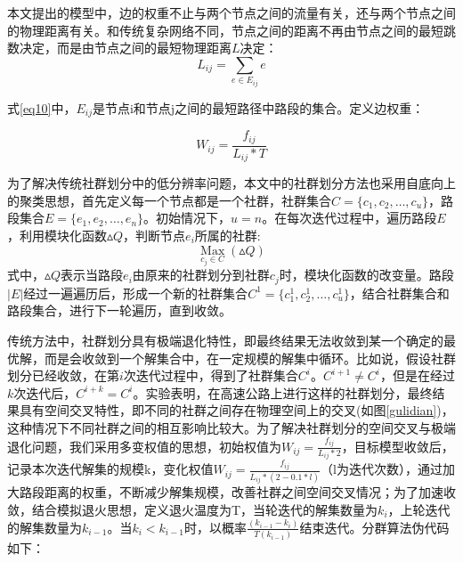 				本文提出的模型中，边的权重不止与两个节点之间的流量有关，还与两个节点之间的物理距离有关。和传统复杂网络不同，节点之间的距离不再由节点之间的最短跳数决定，而是由节点之间的最短物理距离$L$决定：
				\begin{equation}
				L_{ij}=\sum\limits_{e \in E_{ij}} {e}
				\label{eq10}
				\end{equation}

				式\ref{eq10}中，$E_{ij}$是节点i和节点j之间的最短路径中路段的集合。定义边权重：


				\begin{equation}
				W_{ij}=\frac{f_{ij}}{L_{ij}*T}
				\label{eq11}
				\end{equation}

				为了解决传统社群划分中的低分辨率问题，本文中的社群划分方法也采用自底向上的聚类思想，首先定义每一个节点都是一个社群，社群集合$C=\{c_1,c_2,\dots,c_u\}$，路段集合$E=\{e_1,e_2,\dots,e_n\}$。初始情况下，$u=n$。在每次迭代过程中，遍历路段$E$，利用模块化函数$\vartriangle Q$，判断节点$e_i$所属的社群:
					$$\mathop{Max}\limits_{c_j\in C} (\vartriangle Q)$$
				式中，$\vartriangle Q$表示当路段$e_i$由原来的社群划分到社群$c_j$时，模块化函数的改变量。路段$|E|$经过一遍遍历后，形成一个新的社群集合$C^1=\{c_1^1,c_2^1,\dots,c_u^1\}$，结合社群集合和路段集合，进行下一轮遍历，直到收敛。

				传统方法中，社群划分具有极端退化特性，即最终结果无法收敛到某一个确定的最优解，而是会收敛到一个解集合中，在一定规模的解集中循环。比如说，假设社群划分已经收敛，在第$i$次迭代过程中，得到了社群集合$C^i$。$C^{i+1}\ne C^{i}$，但是在经过$k$次迭代后，$C^{i+k}=C^{i}$。实验表明，在高速公路上进行这样的社群划分，最终结果具有空间交叉特性，即不同的社群之间存在物理空间上的交叉(如图\ref{gulidian})，这种情况下不同社群之间的相互影响比较大。为了解决社群划分的空间交叉与极端退化问题，我们采用多变权值的思想，初始权值为$W_{ij}=\frac{f_{ij}}{L_{ij}*2}$，目标模型收敛后，记录本次迭代解集的规模k，变化权值$W_{ij}=\frac{f_{ij}}{L_{ij}*(2-0.1*l)}$（l为迭代次数），通过加大路段距离的权重，不断减少解集规模，改善社群之间空间交叉情况；为了加速收敛，结合模拟退火思想，定义退火温度为T，当轮迭代的解集数量为$k_i$，上轮迭代的解集数量为$k_{i-1}$。当$k_i<k_{i-1}$时，以概率$\frac {(k_{i-1}-k_i)}{T(k_{i-1})}$结束迭代。分群算法伪代码如下：

